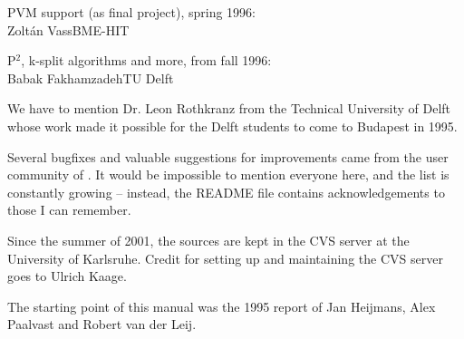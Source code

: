 PVM support (as final project), spring 1996:\\
\tab Zolt\'{a}n Vass\tab \tab BME-HIT

P$^{2}$, k-split algorithms and more, from fall 1996:\\
\tab Babak Fakhamzadeh\tab TU Delft


We have to mention Dr. Leon Rothkranz from the Technical University 
of Delft whose work made it possible for the Delft students to 
come to Budapest in 1995.

Several bugfixes and valuable suggestions for improvements came 
from the user community of {\opp}. It would be impossible to 
mention everyone here, and the list is constantly growing -- 
instead, the README file contains acknowledgements to those I 
can remember.

Since the summer of 2001, the {\opp} sources are kept in the 
CVS server at the University of Karlsruhe. Credit for setting 
up and maintaining the CVS server goes to Ulrich Kaage.

The starting point of this manual was the 1995 report of Jan 
Heijmans, Alex Paalvast and Robert van der Leij.

